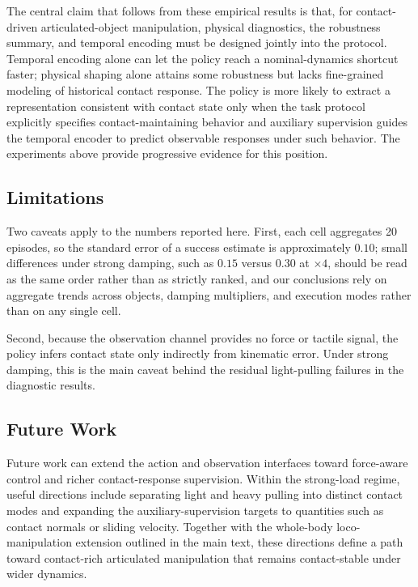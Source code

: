 The central claim that follows from these empirical results is that,
for contact-driven articulated-object manipulation, physical
diagnostics, the robustness summary, and temporal encoding must be
designed jointly into the protocol. Temporal encoding alone can let
the policy reach a nominal-dynamics shortcut faster; physical shaping
alone attains some robustness but lacks fine-grained modeling of
historical contact response. The policy is more likely to extract a
representation consistent with contact state only when the task
protocol explicitly specifies contact-maintaining behavior
and auxiliary supervision guides the temporal encoder to predict
observable responses under such behavior. The experiments above
provide progressive evidence for this position.


\subsection{Limitations}
\label{sec:limits}

Two caveats apply to the numbers reported here. First, each cell
aggregates 20 episodes, so the standard error of a success estimate is
approximately $0.10$; small differences under strong damping, such as
$0.15$ versus $0.30$ at $\times4$, should be read as the same order
rather than as strictly ranked, and our conclusions rely on aggregate
trends across objects, damping multipliers, and execution modes rather
than on any single cell.

Second, because the observation channel provides no force or tactile
signal, the policy infers contact state only indirectly from
kinematic error. Under strong damping, this is the main caveat behind
the residual light-pulling failures in the diagnostic results.


\subsection{Future Work}
\label{sec:additional_future_work}

Future work can extend the action and observation interfaces toward
force-aware control and richer contact-response supervision. Within
the strong-load regime, useful directions include separating light and
heavy pulling into distinct contact modes and expanding the
auxiliary-supervision targets to quantities such as contact normals or
sliding velocity. Together with the whole-body loco-manipulation
extension outlined in the main text, these directions define a path
toward contact-rich articulated manipulation that remains
contact-stable under wider dynamics.

